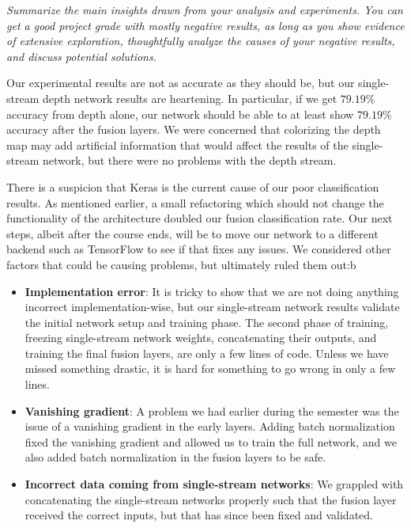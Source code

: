 
\textit{Summarize the main insights drawn from your analysis and experiments. You can get a good project grade with mostly negative results, as long as you show evidence of extensive exploration, thoughtfully analyze the causes of your negative results, and discuss potential solutions.}

Our experimental results are not as accurate as they should be, but our single-stream depth network results are heartening. In particular, if we get $79.19\%$ accuracy from depth alone, our network should be able to at least show $79.19\%$ accuracy after the fusion layers. We were concerned that colorizing the depth map may add artificial information that would affect the results of the single-stream network, but there were no problems with the depth stream.

There is a suspicion that Keras is the current cause of our poor classification results. As mentioned earlier, a small refactoring which should not change the functionality of the architecture doubled our fusion classification rate. Our next steps, albeit after the course ends, will be to move our network to a different backend such as TensorFlow to see if that fixes any issues. We considered other factors that could be causing problems, but ultimately ruled them out:b

\begin{itemize}
    \item \textbf{Implementation error}: It is tricky to show that we are not doing anything incorrect implementation-wise, but our single-stream network results validate the initial network setup and training phase. The second phase of training, freezing single-stream network weights, concatenating their outputs, and training the final fusion layers, are only a few lines of code. Unless we have missed something drastic, it is hard for something to go wrong in only a few lines.

    \item \textbf{Vanishing gradient}: A problem we had earlier during the semester was the issue of a vanishing gradient in the early layers. Adding batch normalization fixed the vanishing gradient and allowed us to train the full network, and we also added batch normalization in the fusion layers to be safe. 

    \item \textbf{Incorrect data coming from single-stream networks}: We grappled with concatenating the single-stream networks properly such that the fusion layer received the correct inputs, but that has since been fixed and validated.

\end{itemize}



